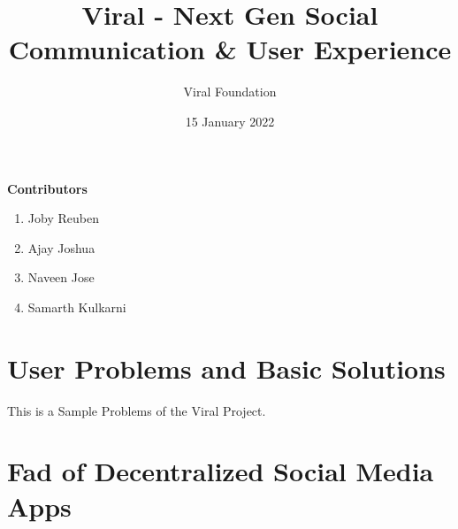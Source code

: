 \documentclass[10pt]{article}
\title{\textbf{Viral - Next Gen Social Communication \& User Experience}}
\date{15 January 2022}
\author{Viral Foundation}
\begin{document}
\maketitle

\begin{abstract}
\lipsum[1]\lipsum[1]
\end{abstract}

\vspace{5mm} %

\textbf{Contributors}
\begin{enumerate}
\item{Joby Reuben}
\item{Ajay Joshua}
\item{Naveen Jose}
\item {Samarth Kulkarni}
\end{enumerate}

\newpage
   \tableofcontents\pagebreak 
   
\section{User Problems and Basic Solutions}
This is a Sample Problems of the Viral Project.

\section{Fad of Decentralized Social Media Apps}
\end{document}
